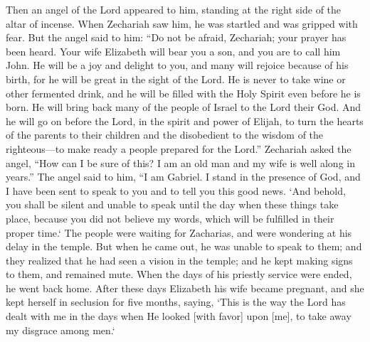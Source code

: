 \begin{scripture}[Luke 1:11-25]
    Then an angel of the Lord appeared to him, standing at the right side of the altar of incense.
    When Zechariah saw him, he was startled and was gripped with fear. 
    But the angel said to him: “Do not be afraid, Zechariah; your prayer has been heard. Your wife Elizabeth will bear you a son, and you are to call him John. 
    He will be a joy and delight to you, and many will rejoice because of his birth, 
    for he will be great in the sight of the Lord. He is never to take wine or other fermented drink, and he will be filled with the Holy Spirit even before he is born. 
    He will bring back many of the people of Israel to the Lord their God. 
    And he will go on before the Lord, in the spirit and power of Elijah, to turn the hearts of the parents to their children and the disobedient to the wisdom of the righteous—to make ready a people prepared for the Lord.”
    Zechariah asked the angel, “How can I be sure of this? I am an old man and my wife is well along in years.”
    The angel said to him, “I am Gabriel. I stand in the presence of God, and I have been sent to speak to you and to tell you this good news. 
    `And behold, you shall be silent and unable to speak until the day when these things take place, because you did not believe my words, which will be fulfilled in their proper time.`
    The people were waiting for Zacharias, and were wondering at his delay in the temple.
    But when he came out, he was unable to speak to them; and they realized that he had seen a vision in the temple; and he kept making signs to them, and remained mute.
    When the days of his priestly service were ended, he went back home.
    After these days Elizabeth his wife became pregnant, and she kept herself in seclusion for five months, saying,
    `This is the way the Lord has dealt with me in the days when He looked [with favor] upon [me], to take away my disgrace among men.`

\end{scripture}

\vspace{2\baselineskip}


